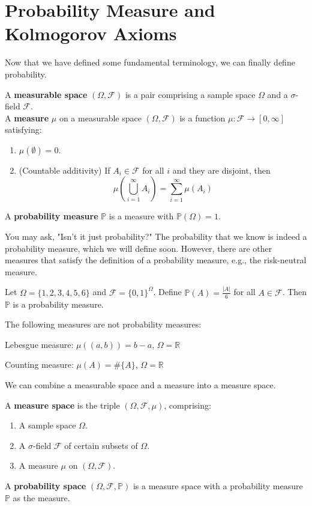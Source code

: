 \documentclass{huhtakm-template-book-v2}
\newcommand{\prob}{\mathbb{P}}
\begin{document}
\section{Probability Measure and Kolmogorov Axioms}
    Now that we have defined some fundamental terminology, we can finally define probability.
    \begin{defn}
        A \textbf{measurable space} $(\Omega,\mathcal{F})$ is a pair comprising a sample space $\Omega$ and a $\sigma$-field $\mathcal{F}$.\\
        A \textbf{measure} $\mu$ on a measurable space $(\Omega,\mathcal{F})$ is a function $\mu:\mathcal{F} \to [0,\infty]$ satisfying:
        \begin{enumerate}
            \item $\mu(\emptyset) = 0$.
            \item (Countable additivity) If $A_{i} \in \mathcal{F}$ for all $i$ and they are disjoint, then 
            \begin{equation*}
                \mu\left(\bigcup_{i = 1}^{\infty}A_{i}\right) = \sum_{i = 1}^{\infty}\mu(A_{i})
            \end{equation*}
        \end{enumerate}
        A \textbf{probability measure} $\prob$ is a measure with $\prob(\Omega) = 1$.
    \end{defn}
    You may ask, "Isn't it just probability?" The probability that we know is indeed a probability measure, which we will define soon. However, there are other measures that satisfy the definition of a probability measure, e.g., the risk-neutral measure.
    \begin{eg}
        Let $\Omega = \{1,2,3,4,5,6\}$ and $\mathcal{F} = \{0,1\}^{\Omega}$. Define $\prob(A) = \frac{|A|}{6}$ for all $A \in \mathcal{F}$. Then $\prob$ is a probability measure.
    \end{eg}
    The following measures are not probability measures:
    \begin{eg}
        Lebesgue measure: $\mu((a, b)) = b-a$, $\Omega = \mathbb{R}$
    \end{eg}
    \begin{eg}
        Counting measure: $\mu(A) = \#\{A\}$, $\Omega = \mathbb{R}$
    \end{eg}
    We can combine a measurable space and a measure into a measure space.
    \begin{defn}
        A \textbf{measure space} is the triple $(\Omega,\mathcal{F},\mu)$, comprising:
        \begin{enumerate}
            \item A sample space $\Omega$.
            \item A $\sigma$-field $\mathcal{F}$ of certain subsets of $\Omega$.
            \item A measure $\mu$ on $(\Omega,\mathcal{F})$.
        \end{enumerate}
        A \textbf{probability space} $(\Omega,\mathcal{F},\prob)$ is a measure space with a probability measure $\prob$ as the measure.
    \end{defn}
\end{document}

